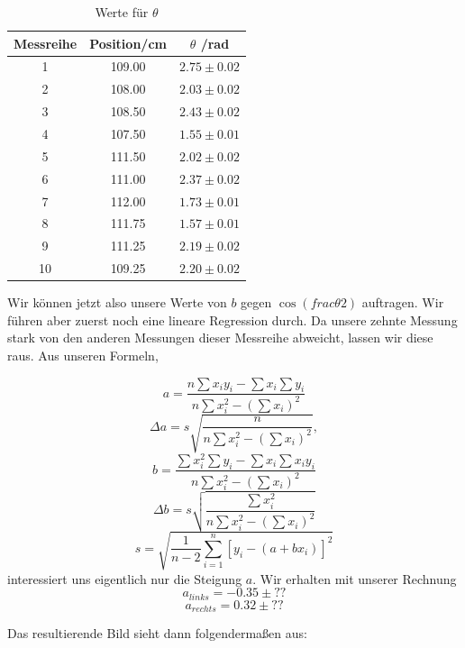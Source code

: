\documentclass[11pt,a4paper]{article}
\begin{document}
\begin{table}[h]
\centering
\caption{Werte f\"ur $\theta$} \vspace{11pt}
\begin{tabular}{ccc}
\toprule
\textrm{Messreihe} & \textrm{Position}/\textrm{cm} & $\theta$ /\textrm{rad} \\
\midrule 
1 & 109.00 & $2.75\pm0.02$ \\
2 & 108.00 & $2.03\pm0.02$ \\
3 & 108.50 & $2.43\pm0.02$ \\
4 & 107.50 & $1.55\pm0.01$\\
5 & 111.50 & $2.02\pm0.02$ \\
6 & 111.00 & $2.37\pm0.02$\\
7 & 112.00 & $1.73\pm0.01$ \\
8 & 111.75 & $1.57\pm0.01$ \\
9 & 111.25 & $2.19\pm0.02$ \\
10 & 109.25 & $2.20\pm0.02$ \\ 
\bottomrule
\end{tabular}
\label{Tab:2}
\end{table}

Wir k\"onnen jetzt also unsere Werte von $b$ gegen $\cos\left(frac{\theta}{2}\right)$ auftragen. Wir f\"uhren aber zuerst noch eine lineare Regression durch. Da unsere zehnte Messung stark von den anderen Messungen dieser Messreihe abweicht, lassen wir diese raus. Aus unseren Formeln,

\begin{equation}
a=\frac{n\sum x_iy_i-\sum x_i\sum y_i}{n\sum x_i^2-(\sum x_i)^2}
\end{equation}
\begin{equation}
\Delta a=s\sqrt{\frac{n}{n\sum x_i^2-(\sum x_i)^2}},
\end{equation}
\begin{equation}
b=\frac{\sum x_i^2\sum y_i-\sum x_i\sum x_iy_i}{n\sum x_i^2-(\sum x_i)^2}
\end{equation}
\begin{equation}
\Delta b=s\sqrt{\frac{\sum x_i^2}{n\sum x_i^2-(\sum x_i)^2}}
\end{equation}
\begin{equation}
s=\sqrt{\frac{1}{n-2}\sum^n_{i=1}[y_i-(a+bx_i)]^2}
\end{equation}
interessiert uns eigentlich nur die Steigung $a$. Wir erhalten mit unserer Rechnung
\[a_{links}=-0.35\pm??\]
\[a_{rechts}=0.32\pm??\]

Das resultierende Bild sieht dann folgenderma\ss en aus:
\end{document}
